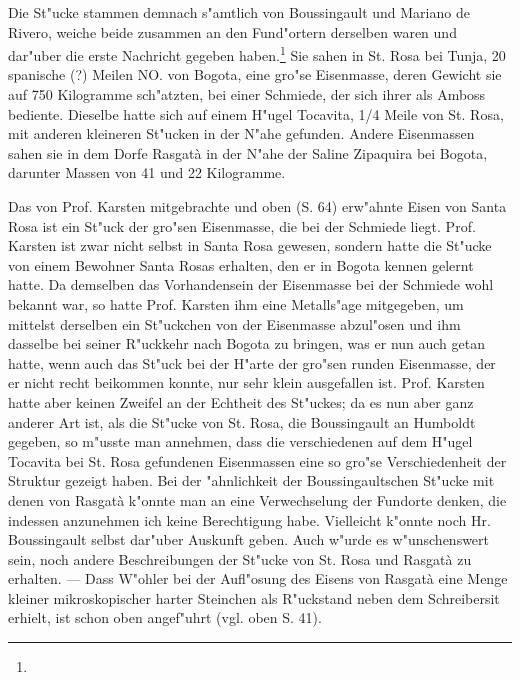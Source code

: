 \documentclass[a4paper, 11pt, oneside]{article}
\begin{document}
Die St"ucke stammen demnach s"amtlich von Boussingault und Mariano de Rivero, weiche beide zusammen an den Fund"ortern derselben waren und dar"uber die erste Nachricht gegeben haben.\footnote{} Sie sahen in St. Rosa bei Tunja, 20 spanische (?) Meilen NO. von Bogota, eine gro"se Eisenmasse, deren Gewicht sie auf 750 Kilogramme sch"atzten, bei einer Schmiede, der sich ihrer als Amboss bediente. Dieselbe hatte sich auf einem H"ugel Tocavita, 1/4 Meile von St. Rosa, mit anderen kleineren St"ucken in der N"ahe gefunden. Andere Eisenmassen sahen sie in dem Dorfe Rasgatà in der N"ahe der Saline Zipaquira bei Bogota, darunter Massen von 41 und 22 Kilogramme.

Das von Prof. Karsten mitgebrachte und oben (S. 64) erw"ahnte Eisen von Santa Rosa ist ein St"uck der gro"sen Eisenmasse, die bei der Schmiede liegt. Prof. Karsten ist zwar nicht selbst in Santa Rosa gewesen, sondern hatte die St"ucke von einem Bewohner Santa Rosas erhalten, den er in Bogota kennen gelernt hatte. Da demselben das Vorhandensein der Eisenmasse bei der Schmiede wohl bekannt war, so hatte Prof. Karsten ihm eine Metalls"age mitgegeben, um mittelst derselben ein St"uckchen von der Eisenmasse abzul"osen und ihm dasselbe bei seiner R"uckkehr nach Bogota zu bringen, was er nun auch getan hatte, wenn auch das St"uck bei der H"arte der gro"sen runden Eisenmasse, der er nicht recht beikommen konnte, nur sehr klein ausgefallen ist. Prof. Karsten hatte aber keinen Zweifel an der Echtheit des St"uckes; da es nun aber ganz anderer Art ist, als die St"ucke von St. Rosa, die Boussingault an Humboldt gegeben, so m"usste man annehmen, dass die verschiedenen auf dem H"ugel Tocavita bei St. Rosa gefundenen Eisenmassen eine so gro"se Verschiedenheit der Struktur gezeigt haben. Bei der "ahnlichkeit der Boussingaultschen St"ucke mit denen von Rasgatà k"onnte man an eine Verwechselung der Fundorte denken, die indessen anzunehmen ich keine Berechtigung habe. Vielleicht k"onnte noch Hr. Boussingault selbst dar"uber Auskunft geben. Auch w"urde es w"unschenswert sein, noch andere Beschreibungen der St"ucke von St. Rosa und Rasgatà zu erhalten. --- Dass W"ohler bei der Aufl"osung des Eisens von Rasgatà eine Menge kleiner mikroskopischer harter Steinchen als R"uckstand neben dem Schreibersit erhielt, ist schon oben angef"uhrt (vgl. oben S. 41).
\end{document}
